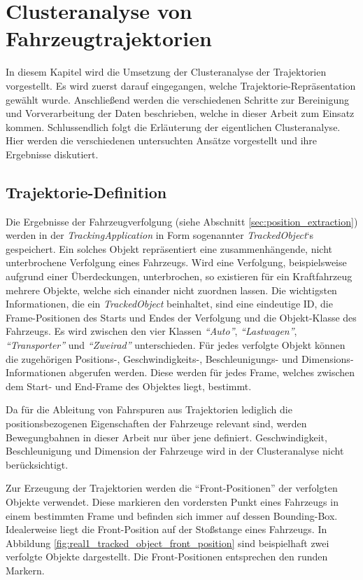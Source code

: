 
\chapter{Clusteranalyse von Fahrzeugtrajektorien}
\label{cha:realisation_clustering}

In diesem Kapitel wird die Umsetzung der Clusteranalyse der Trajektorien vorgestellt.
Es wird zuerst darauf eingegangen, welche Trajektorie-Repräsentation gewählt wurde. Anschließend
werden die verschiedenen Schritte zur Bereinigung und Vorverarbeitung der Daten beschrieben, welche
in dieser Arbeit zum Einsatz kommen. Schlussendlich folgt die Erläuterung der eigentlichen Clusteranalyse.
Hier werden die verschiedenen untersuchten Ansätze vorgestellt und ihre Ergebnisse diskutiert.

\section{Trajektorie-Definition}

Die Ergebnisse der Fahrzeugverfolgung (siehe Abschnitt \ref{sec:position_extraction}) werden
in der \textit{TrackingApplication} in Form sogenannter \textit{TrackedObject}`s gespeichert.
Ein solches Objekt repräsentiert eine zusammenhängende, nicht unterbrochene Verfolgung eines Fahrzeugs.
Wird eine Verfolgung, beispielsweise aufgrund einer Überdeckungen, unterbrochen, so existieren für ein
Kraftfahrzeug mehrere Objekte, welche sich einander nicht zuordnen lassen.
Die wichtigsten Informationen, die ein \textit{TrackedObject} beinhaltet, sind eine eindeutige ID,
die Frame-Positionen des Starts und Endes der Verfolgung und die Objekt-Klasse des Fahrzeugs. Es wird
zwischen den vier Klassen \textit{``Auto''}, \textit{``Lastwagen''}, \textit{``Transporter''}
und \textit{``Zweirad''} unterschieden.
Für jedes verfolgte Objekt können die zugehörigen Positions-, Geschwindigkeits-, Beschleunigungs-
und Dimensions-Informationen abgerufen werden. Diese werden für jedes Frame, welches zwischen dem Start-
und End-Frame des Objektes liegt, bestimmt.

Da für die Ableitung von Fahrspuren aus Trajektorien lediglich die positionsbezogenen Eigenschaften
der Fahrzeuge relevant sind, werden Bewegungbahnen in dieser Arbeit nur über jene definiert.
Geschwindigkeit, Beschleunigung und Dimension der Fahrzeuge wird in der Clusteranalyse nicht berücksichtigt.

Zur Erzeugung der Trajektorien werden die ``Front-Positionen'' der verfolgten Objekte verwendet. Diese markieren den
vordersten Punkt eines Fahrzeugs in einem bestimmten Frame und befinden sich immer auf dessen Bounding-Box.
Idealerweise liegt die Front-Position auf der Stoßstange eines Fahrzeugs. In Abbildung \ref{fig:real1_tracked_object_front_position}
sind beispielhaft zwei verfolgte Objekte dargestellt. Die Front-Positionen entsprechen den runden Markern.

